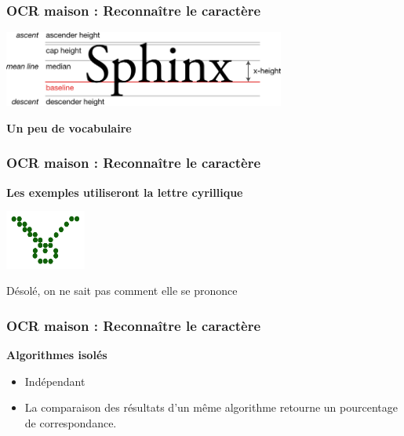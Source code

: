 \documentclass[xcolor=dvipsnames]{beamer}
\begin{document}
\begin{frame}
\frametitle{OCR maison : Reconnaître le caractère }
        \includegraphics[width=350px]{Typography_Line_Terms.png}
      \begin{alertblock}{}
            \begin{center}
                  \textbf{\Large Un peu de vocabulaire}
            \end{center}
      \end{alertblock}
\end{frame}

\begin{frame}
\frametitle{OCR maison : Reconnaître le caractère }
      \begin{alertblock}{}
    \begin{center}
              \textbf{\Large Les exemples utiliseront la lettre cyrillique}
    \end{center}
      \end{alertblock}
    \begin{center}
       \pause
       \includegraphics[width=100px]{chmoll.png}
    \end{center}
    \begin{center}
      \pause Désolé, on ne sait pas comment elle se prononce
    \end{center}
\end{frame}


\begin{frame}
  \frametitle{OCR maison : Reconnaître le caractère}

  \begin{center}\begin{alertblock}{}
    \begin{center}\textbf{\Large Algorithmes isolés}\end{center}
  \end{alertblock}\end{center}
  
  \begin{itemize}[<+->]
   \item Indépendant
   \item La comparaison des résultats d'un même algorithme retourne un pourcentage de correspondance.
  \end{itemize}
\end{frame}
\end{document}
